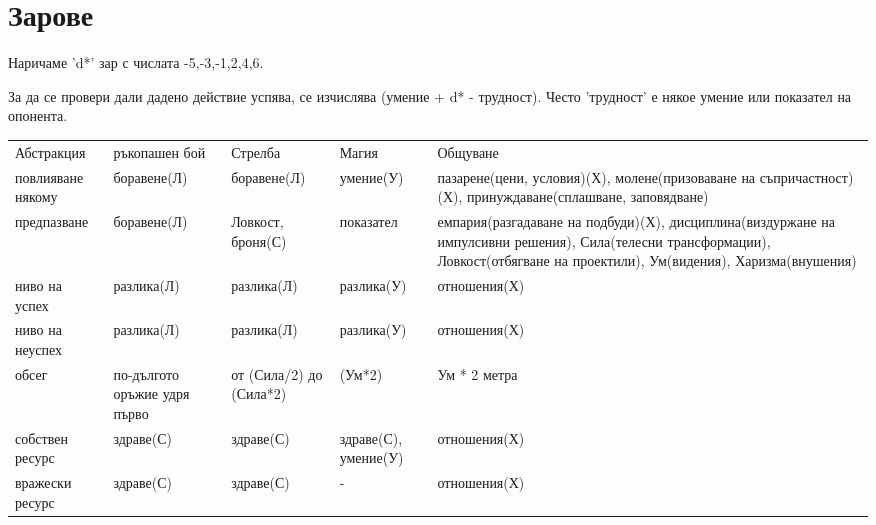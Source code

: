 \chapter{Зарове}

Наричаме 'd*' зар с числата {-5,-3,-1,2,4,6}.

За да се провери дали дадено действие успява, се изчислява (умение + d* - трудност).
Често 'трудност' е някое умение или показател на опонента.

\begin{tabular}{ p{2cm} | p{2cm} |  p{2cm} | p{2cm} | p{6cm} }
Абстракция        & ръкопашен бой                & Стрелба                 & Магия                & Общуване      \\
повлияване някому & боравене(Л)                  & боравене(Л)             & умение(У)            & пазарене(цени, условия)(Х), молене(призоваване на съпричастност)(Х), принуждаване(сплашване, заповядване)  \\
предпазване       & боравене(Л)                  & Ловкост, броня(С)       & показател            & емпария(разгадаване на подбуди)(Х), дисциплина(виздуржане на импулсивни решения), Сила(телесни трансформации), Ловкост(отбягване на проектили), Ум(видения), Харизма(внушения)  \\
ниво на успех     & разлика(Л)                   & разлика(Л)              & разлика(У)           & отношения(Х)  \\
ниво на неуспех   & разлика(Л)                   & разлика(Л)              & разлика(У)           & отношения(Х)  \\
обсег             & по-дългото оръжие удря първо & от (Сила/2) до (Сила*2) & (Ум*2)               & Ум * 2 метра  \\
собствен ресурс   & здраве(С)                    & здраве(С)               & здраве(С), умение(У) & отношения(Х)  \\
вражески ресурс   & здраве(С)                    & здраве(С)               & -                    & отношения(Х)  \\
\end{tabular}
